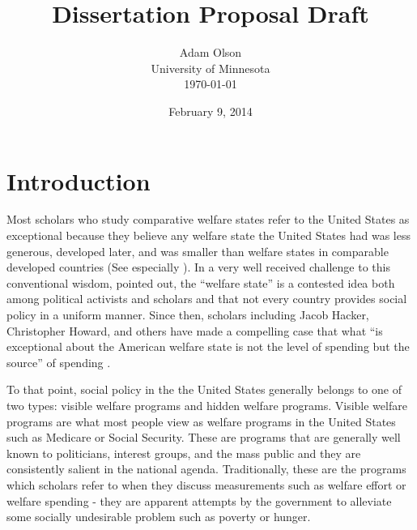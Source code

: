 \documentclass[12pt]{article}
\author{Adam Olson\\University of Minnesota\\ \today}
\title{Dissertation Proposal Draft}
\date{February 9, 2014}
\makeatletter
\renewcommand{\maketitle}{\bgroup\setlength{\parindent}{0pt}
\begin{flushleft}
  \textbf{\@title}

  \@author
\end{flushleft}\egroup
}
\makeatother
\begin{document}
\maketitle

\section{Introduction}
Most scholars who study comparative welfare states refer to the United States as exceptional because they believe any welfare state the United States had was less generous, developed later, and was smaller than welfare states in comparable developed countries (See especially \citealt{andersen1990}). In a very well received challenge to this conventional wisdom, \citet{hacker2002} pointed out, the ``welfare state'' is a contested idea both among political activists and scholars and that not every country provides social policy in a uniform manner. Since then, scholars including Jacob Hacker, Christopher Howard, and others have made a compelling case that what ``is exceptional about the American welfare state is not the level of spending but the source'' of spending \citep[pg. 7]{hacker2002}.

To that point, social policy in the the United States generally belongs to one of two types: visible welfare programs and hidden welfare programs. Visible welfare programs are what most people view as welfare programs in the United States such as Medicare or Social Security. These are programs that are generally well known to politicians, interest groups, and the mass public and they are consistently salient in the national agenda. Traditionally, these are the programs which scholars refer to when they discuss measurements such as welfare effort or welfare spending - they are apparent attempts by the government to alleviate some socially undesirable problem such as poverty or hunger.
\end{document}
